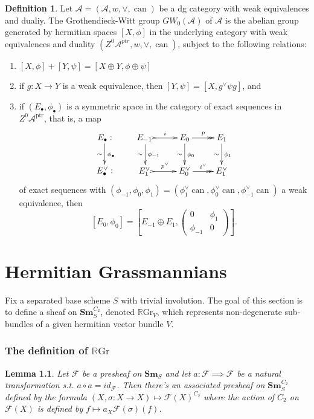 \documentclass[draftthesis,tocnosub,noragright,centerchapter,10pt]{uiucthesis2009}
\newcommand{\mc}{\mathcal}
\newcommand{\RGr}{\mathbb R\mathrm{Gr}}
\newcommand{\Sm}[1]{\mathbf{Sm}_{#1}}
\newcommand{\ptr}{\mathrm{ptr}}
\DeclareMathOperator{\can}{can}
\theoremstyle{plain}
\newtheorem{lemma}{Lemma}
\theoremstyle{definition}
\newtheorem{definition}[lemma]{Definition}
\begin{document}
\begin{definition}
Let $\mathscr A = (\mc A,w,\vee,\can)$ be a dg category with weak
equivalences and dualiy. The Grothendieck-Witt group $GW_0(\mathscr
A)$ of $\mathscr A$ is the abelian group generated by hermitian spaces
$[X,\phi]$ in the underlying category with weak equivalences and
duality $(Z^0\mc A^{ptr},w,\vee,\can)$, subject to the following
relations:
\begin{enumerate}
\item $[X,\phi] + [Y,\psi] = [X \oplus Y,\phi \oplus \psi]$
\item if $g : X \rightarrow Y$ is a weak equivalence, then $[Y,\psi] =
  [X,g^\vee \psi g]$, and
\item if $(E_\bullet,\phi_\bullet)$ is a symmetric space in the
  category of exact sequences in $Z^0\mc A^\ptr$, that is, a map
\[
\xymatrix{E_\bullet :  \ar[d]_\sim^{\phi_\bullet} \\ E^\vee_\bullet :}
\qquad \xymatrix{E_{-1} \, \ar@{>->}[r]^i \ar[d]_\sim^{\phi_{-1}} &
  E_0 \ar@{->>}[r]^p \ar[d]_\sim^{\phi_0} & E_1 \ar[d]_\sim^{\phi_1}
  \\
E_{1}^\vee \, \ar@{>->}[r]^{p^\vee} &
  E_0^\vee \ar@{->>}[r]^{i^\vee} & E_1^\vee }
\]
of exact sequences with $(\phi_{-1},\phi_0,\phi_1) = (\phi_1^\vee
\can, \phi_0^\vee \can, \phi^\vee_{-1}\can)$ a weak equivalence, then
\[
[E_0,\phi_0] = \left[E_{-1} \oplus E_1, \begin{pmatrix}
0 & \phi_1\\
\phi_{-1} & 0
\end{pmatrix} \right].
\]
\end{enumerate}
\end{definition}






\chapter{Hermitian Grassmannians}

Fix a separated base scheme $S$ with trivial involution. The goal of
this section is to define a sheaf on $\Sm{S}^{C_2}$, denoted $\RGr_V$, which represents
non-degenerate sub-bundles of a given hermitian vector bundle $V$. 

\subsection{The definition of $\RGr$}

\begin{lemma}\label{lem:action_presheaf}
Let $\mc F$ be a presheaf on $\Sm{S}$ and let $a : \mc F \implies
\mc F$ be a natural transformation s.t. $a \circ a = id_{\mc F}$. Then
there's an associated presheaf on $\Sm{S}^{C_2}$ defined by the formula
$(X,\sigma : X \rightarrow X) \mapsto \mc F(X)^{C_2}$ where the action
of $C_2$ on $\mc F(X)$ is defined by $f \mapsto  a_X\mc F(\sigma)(f)$.
\end{lemma}
\end{document}
